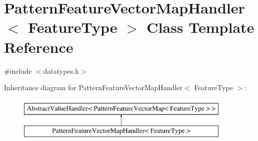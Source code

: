 \hypertarget{classPatternFeatureVectorMapHandler}{}\section{Pattern\+Feature\+Vector\+Map\+Handler$<$ Feature\+Type $>$ Class Template Reference}
\label{classPatternFeatureVectorMapHandler}


{\ttfamily \#include $<$datatypes.\+h$>$}

Inheritance diagram for Pattern\+Feature\+Vector\+Map\+Handler$<$ Feature\+Type $>$\+:\begin{figure}[H]
\begin{center}
\leavevmode
\includegraphics[height=2.000000cm]{classPatternFeatureVectorMapHandler}
\end{center}
\end{figure}
